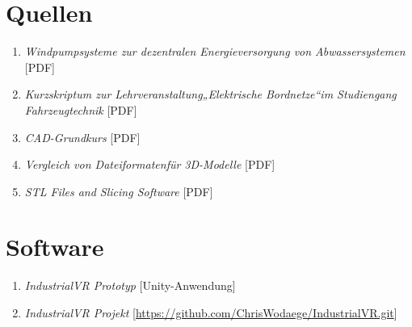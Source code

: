 

\appendix
\renewcommand\thesection{\Alph{section}}

\section{Quellen}

\begin{enumerate}[label=A\arabic*]

\item \textit{Windpumpsysteme zur dezentralen Energieversorgung von Abwassersystemen} [PDF]
\item \textit{Kurzskriptum zur Lehrveranstaltung„Elektrische Bordnetze“im Studiengang Fahrzeugtechnik} [PDF]
\item \textit{CAD-Grundkurs} [PDF]
\item \textit{Vergleich von Dateiformatenfür 3D-Modelle} [PDF] 
\item \textit{STL Files and Slicing Software} [PDF] 
\end{enumerate}

\section{Software}

\begin{enumerate}[label=B\arabic*]

\item \textit{IndustrialVR Prototyp} [Unity-Anwendung]
\item \textit{IndustrialVR Projekt} [\url{https://github.com/ChrisWodaege/IndustrialVR.git}]

\end{enumerate}